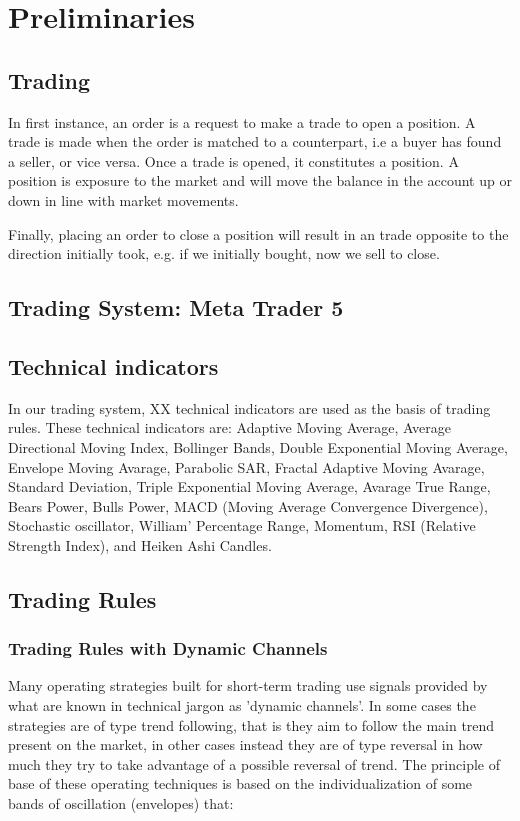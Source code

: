 \section{Preliminaries}

\subsection{Trading}
In first instance, an order is a request to make a trade to open a position.
A trade is made when the order is matched to a counterpart, i.e a buyer has found a seller, or vice versa.
Once a trade is opened, it constitutes a position. A position is exposure to the market and will move the balance in the account up or down in line with market movements.

Finally, placing an order to close a position will result in an trade opposite to the direction initially took, e.g. if we initially bought, now we sell to close.

\subsection{Trading System: Meta Trader 5}

\subsection{Technical indicators}
In our trading system, XX technical indicators are used as the basis of trading rules. These technical indicators are: Adaptive Moving Average, Average Directional Moving Index, Bollinger Bands, Double Exponential Moving Average, Envelope Moving Avarage, Parabolic SAR, Fractal Adaptive Moving Avarage, Standard Deviation, Triple Exponential Moving Average, Avarage True Range, Bears Power, Bulls Power, MACD (Moving Average Convergence Divergence), Stochastic oscillator, William' Percentage Range, Momentum, RSI (Relative Strength Index), and Heiken Ashi Candles.

\subsection{Trading Rules}

\subsubsection{Trading Rules with Dynamic Channels}

Many operating strategies built for short-term trading use signals provided by what are known in technical jargon as 'dynamic channels'. In some cases the strategies are of type trend following, that is they aim to follow the main trend present on the market, in other cases instead they are of type reversal in how much they try to take advantage of a possible reversal of trend.
The principle of base of these operating techniques is based on the individualization of some bands of oscillation (envelopes) that:

